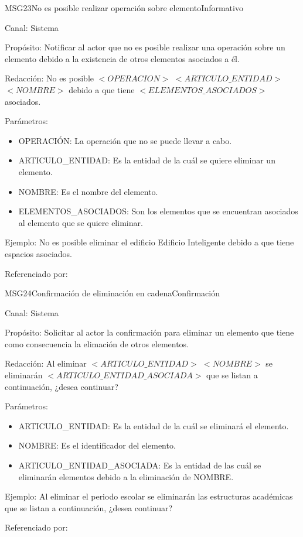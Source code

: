 \begin{mensaje}{MSG23}{No es posible realizar operación sobre elemento}{Informativo}
	\item[Canal:] Sistema
	\item[Propósito:] Notificar al actor que no es posible realizar una operación sobre un elemento debido a la existencia de otros elementos asociados a él.
	\item[Redacción:] No es posible $<OPERACION>$ $<ARTICULO\_ENTIDAD>$ $<NOMBRE>$ debido a que tiene $<ELEMENTOS\_ASOCIADOS>$ asociados.
	\item[Parámetros:] 
	\begin{itemize}
		\item OPERACIÓN: La operación que no se puede llevar a cabo.
		\item ARTICULO\_ENTIDAD: Es la entidad de la cuál se quiere eliminar un elemento.
		\item NOMBRE: Es el nombre del elemento.
		\item ELEMENTOS\_ASOCIADOS: Son los elementos que se encuentran asociados al elemento que se quiere eliminar.
	\end{itemize}
	\item[Ejemplo:] No es posible eliminar el edificio Edificio Inteligente debido a que tiene espacios asociados. 
	\item[Referenciado por: ] 
\end{mensaje}

\begin{mensaje}{MSG24}{Confirmación de eliminación en cadena}{Confirmación}
	\item[Canal:] Sistema
	\item[Propósito:] Solicitar al actor la confirmación para eliminar un elemento que tiene como consecuencia la elimación de otros elementos.
	\item[Redacción:] Al eliminar $<ARTICULO\_ENTIDAD>$ $<NOMBRE>$ se eliminarán $<ARTICULO\_ENTIDAD\_ASOCIADA>$ que se listan a continuación, ¿desea continuar?
	\item[Parámetros:] 
	\begin{itemize}
		\item ARTICULO\_ENTIDAD: Es la entidad de la cuál se eliminará el elemento.
		\item NOMBRE: Es el identificador del elemento.
		\item ARTICULO\_ENTIDAD\_ASOCIADA: Es la entidad de las cuál se eliminarán elementos debido a la eliminación de NOMBRE.
	\end{itemize}
	\item[Ejemplo:]  Al eliminar el periodo escolar se eliminarán las estructuras académicas que se listan a continuación, ¿desea continuar?
	\item[Referenciado por: ] 
\end{mensaje}

